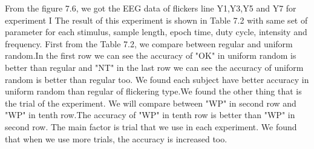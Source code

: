\begin{table}[ht]
\centering
{}
\caption{Experiment result}
\label{table:3}
\end{table}
From the figure 7.6, we got the EEG data of flickers line Y1,Y3,Y5 and Y7 for experiment I
The result of this experiment is shown in Table 7.2 with same set of parameter for each stimulus, sample length, epoch time, duty cycle, intensity and frequency. First from the Table 7.2, we compare between regular and uniform random.In the first row we can see the accuracy of "OK" in uniform random is better than regular and "NT" in the last row we can see the accuracy of uniform random is better than regular too. We found each subject have better accuracy in uniform random than regular of flickering type.We found the other thing that is the trial of the experiment. We will compare between "WP" in second row and "WP" in tenth row.The accuracy of "WP" in tenth row is better than "WP" in second row. The main factor is trial that we use in each experiment. We found that when we use more trials, the accuracy is increased too.

